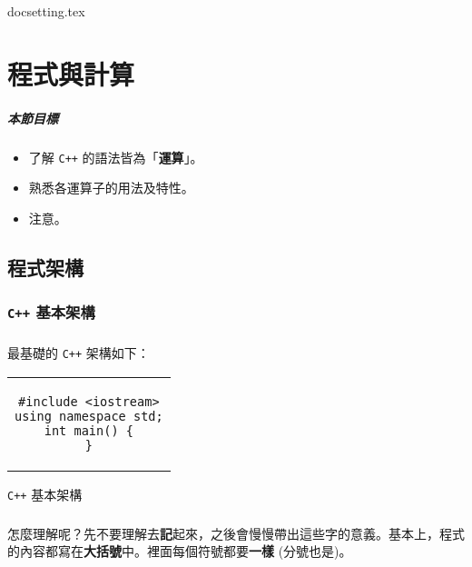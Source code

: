 \documentclass[12pt,a4paper,oneside]{report}
\begin{document}
\begin{CJK}{UTF8}{bkai}

{docsetting.tex}
\setcounter{chapter}{0}

\fi

\providecommand*\probpath{../uva.data/problem/store/}

\chapter{程式與計算}

\paragraph{本節目標}
\begin{itemize}
\item 了解 \texttt{C++} 的語法皆為「\textbf{運算}」。
\item 熟悉各運算子的用法及特性。
\item 注意。
\end{itemize}

\section{程式架構}
\subsection{\texttt{C++} 基本架構}

\paragraph{}最基礎的 \texttt{C++} 架構如下：

\begin{code}[h!]
\centering
\begin{tabular}{c}
\begin{lstlisting}
#include <iostream>
using namespace std;
int main() {
}
\end{lstlisting}
\end{tabular}
\caption{\texttt{C++} 基本架構}
\label{basic:cpp:code:main}
\end{code}

\paragraph{}怎麼理解呢？先不要理解去\textbf{記}起來，之後會慢慢帶出這些字的意義。基本上，程式的內容都寫在\textbf{大括號}中。裡面每個符號都要\textbf{一樣} (分號也是)。

\end{CJK}
\end{document}
